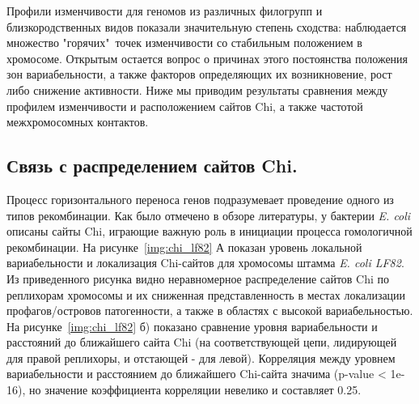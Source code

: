 Профили изменчивости для геномов из различных филогрупп и близкородственных видов показали значительную степень сходства: наблюдается множество "горячих"\ точек изменчивости со стабильным положением в хромосоме. Открытым остается вопрос о причинах этого постоянства положения зон вариабельности, а также факторов определяющих их возникновение, рост либо снижение активности. Ниже мы приводим результаты сравнения между профилем изменчивости и расположением сайтов Chi, а также частотой межхромосомных контактов. 

\subsection{Связь с распределением сайтов Chi.}
Процесс горизонтального переноса генов подразумевает проведение одного из типов рекомбинации. Как было отмечено в обзоре литературы, у бактерии \textit{E. coli} описаны сайты Chi, играющие важную роль в инициации процесса гомологичной рекомбинации. 
На рисунке~\ref{img:chi_lf82} А показан уровень локальной вариабельности и локализация Chi-сайтов для хромосомы штамма \textit{E. coli LF82}. Из приведенного рисунка видно неравномерное распределение сайтов Chi по реплихорам хромосомы и их сниженная представленность в местах локализации профагов/островов патогенности, а также в областях с высокой вариабельностью. На рисунке~\ref{img:chi_lf82} б) показано сравнение уровня вариабельности и расстояний до ближайшего сайта Chi (на соответствующей цепи, лидирующей для правой реплихоры, и отстающей - для левой). Корреляция между уровнем вариабельности и расстоянием до ближайшего Chi-сайта значима (p-value < 1e-16), но значение коэффициента корреляции невелико и составляет 0.25.
